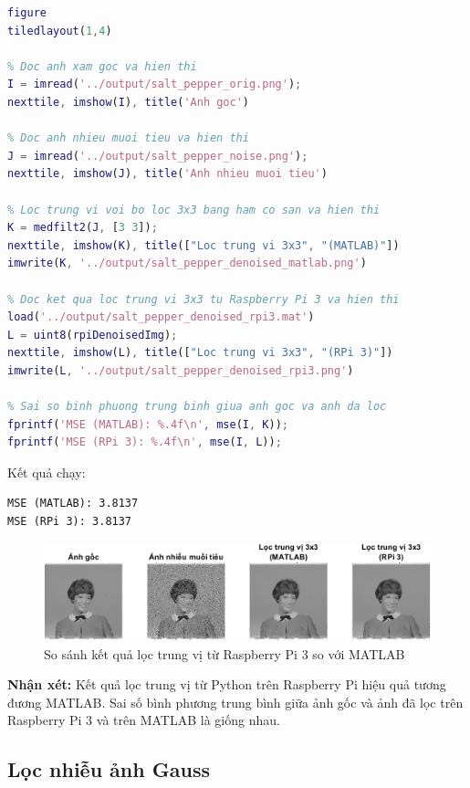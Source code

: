 \begin{lstlisting}[language=MATLAB]
figure
tiledlayout(1,4)

% Doc anh xam goc va hien thi
I = imread('../output/salt_pepper_orig.png');
nexttile, imshow(I), title('Anh goc')

% Doc anh nhieu muoi tieu va hien thi
J = imread('../output/salt_pepper_noise.png');
nexttile, imshow(J), title('Anh nhieu muoi tieu')

% Loc trung vi voi bo loc 3x3 bang ham co san va hien thi
K = medfilt2(J, [3 3]);
nexttile, imshow(K), title(["Loc trung vi 3x3", "(MATLAB)"])
imwrite(K, '../output/salt_pepper_denoised_matlab.png')

% Doc ket qua loc trung vi 3x3 tu Raspberry Pi 3 va hien thi
load('../output/salt_pepper_denoised_rpi3.mat')
L = uint8(rpiDenoisedImg);
nexttile, imshow(L), title(["Loc trung vi 3x3", "(RPi 3)"])
imwrite(L, '../output/salt_pepper_denoised_rpi3.png')

% Sai so binh phuong trung binh giua anh goc va anh da loc
fprintf('MSE (MATLAB): %.4f\n', mse(I, K));
fprintf('MSE (RPi 3): %.4f\n', mse(I, L));
\end{lstlisting}

Kết quả chạy:

\begin{lstlisting}[style=output]
MSE (MATLAB): 3.8137
MSE (RPi 3): 3.8137
\end{lstlisting}

\begin{figure}[H]
    \centering
    \includegraphics[width=1\linewidth]{../images/salt_peper_compare.png}
    \caption{So sánh kết quả lọc trung vị từ Raspberry Pi 3 so với MATLAB}
\end{figure}

\textbf{Nhận xét:} Kết quả lọc trung vị từ Python trên Raspberry Pi hiệu quả tương đương MATLAB. 
Sai số bình phương trung bình giữa ảnh gốc và ảnh đã lọc trên Raspberry Pi 3 và trên MATLAB là giống nhau.

\subsection{Lọc nhiễu ảnh Gauss}

